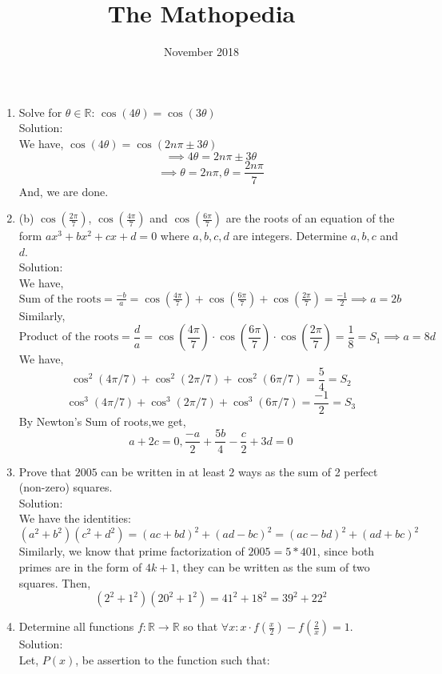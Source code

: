 \documentclass{article}
\begin{document}
\title{The Mathopedia}
\author{}
\date{November 2018}
\maketitle
\begin{enumerate}
    \item  Solve for $\theta\in\mathbb{R}$: $\cos(4\theta)=\cos(3\theta)$\\
    Solution:\\
    We have, $\cos(4 \theta)=\cos(2n \pi \pm 3 \theta)$
    $$ \implies 4 \theta = 2n \pi \pm 3 \theta $$
    $$\implies \theta= 2n \pi, \theta = \frac{2n \pi }{7}  $$
    And, we are done.
    \item (b) $\cos\left(\frac{2\pi}{7}\right)$, $\cos\left(\frac{4\pi}{7}\right)$ and $\cos\left(\frac{6\pi}{7}\right)$ are the roots of an equation of the form $ax^3+bx^2+cx+d = 0$ where $a, b, c, d$ are integers. Determine $a, b, c$ and $d$. \\
    Solution:\\
    We have, $\text{Sum of the roots}= \frac{-b}{a}=\cos\left(\frac{4\pi}{7}\right)+ \cos\left(\frac{6\pi}{7}\right)+ \cos\left(\frac{2\pi}{7}\right)= \frac{-1}{2} \implies a=2b$
    Similarly, 
    $$\text{Product of the roots}= \frac{d}{a}=\cos\left(\frac{4\pi}{7}\right) \cdot \cos\left(\frac{6\pi}{7}\right) \cdot \cos\left(\frac{2\pi}{7}\right)=\frac{1}{8}=S_1 \implies a=8d $$
    We have,
    $$\cos^2 (4\pi/7) + \cos^2 (2\pi/7) + \cos^2 (6\pi /7) = \frac{5}{4} = S_2$$
    $$\cos^3 (4\pi/7) + \cos^3 (2\pi/7) + \cos^3 (6\pi /7)=\frac{-1}{2}= S_3$$
    By Newton's Sum of roots,we get,
    $$ a+2c=0 , \frac{-a}{2}+\frac{5b}{4}-\frac{c}{2}+3d=0$$
    \item Prove that $2005$ can be written in at least $2$ ways as the sum of 2 perfect (non-zero) squares.\\
    Solution:\\
    We have the identities:
    $$(a^2+b^2)(c^2+d^2) = (ac + bd)^2 + (ad-bc)^2 = (ac - bd)^2 + (ad+bc)^2$$
    Similarly, we know that prime factorization of $2005= 5*401$, since both primes are in the form of $4k+1$, they can be written as the sum of two squares.
    Then, $$(2^2+1^2)(20^2+1^2) =41^2 + 18^2 = 39^2 + 22^2  $$
    \item Determine all functions $f: \mathbb{R}\to \mathbb{R}$ so that $\forall x: x\cdot f(\frac x 2) - f(\frac 2 x) = 1$.\\
    Solution:\\
    Let, $P(x)$, be assertion to the function such that:

\end{enumerate}
\end{document}
